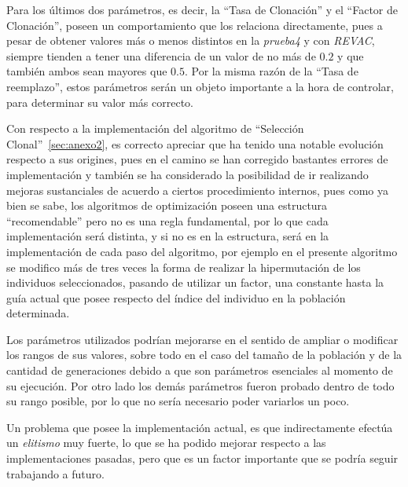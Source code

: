 Para los últimos dos parámetros, es decir, la ``Tasa de Clonación'' y el ``Factor de Clonación'',
poseen un comportamiento que los relaciona directamente, pues a pesar de obtener valores más o menos
distintos en la \emph{prueba4} y con \emph{REVAC}, siempre tienden a tener una diferencia de un valor de no más
de $0.2$ y que también ambos sean mayores que $0.5$. Por la misma razón de la ``Tasa de reemplazo'',
estos parámetros serán un objeto importante a la hora de controlar, para determinar su valor más correcto.



Con respecto a la implementación del algoritmo de ``Selección Clonal''~\ref{sec:anexo2}, es correcto apreciar que ha tenido una notable
evolución respecto a sus origines, pues en el camino se han corregido bastantes errores de implementación y también
se ha considerado la posibilidad de ir realizando mejoras sustanciales de acuerdo a ciertos procedimiento internos,
pues como ya bien se sabe, los algoritmos de optimización poseen una estructura ``recomendable'' pero no es una regla
fundamental, por lo que cada implementación será distinta, y si no es en la estructura, será en la implementación de cada
paso del algoritmo, por ejemplo en el presente algoritmo se modifico más de tres veces la forma de realizar la hipermutación
de los individuos seleccionados, pasando de utilizar un factor, una constante hasta la guía actual que posee respecto
del índice del individuo en la población determinada.

Los parámetros utilizados podrían mejorarse en el sentido de  ampliar o modificar los rangos de sus valores, sobre todo
en el caso del tamaño de la población y de la cantidad de generaciones debido a que son parámetros esenciales al momento
de su ejecución. Por otro lado los demás parámetros fueron probado dentro de todo su rango posible, por lo que no sería
necesario poder variarlos un poco.

Un problema que posee la implementación actual, es que indirectamente efectúa un \emph{elitismo} muy fuerte, lo que se ha
podido mejorar respecto a las implementaciones pasadas, pero que es un factor importante que se podría seguir trabajando a futuro.

